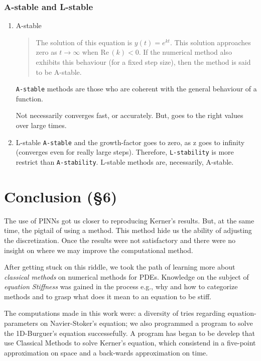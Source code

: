 \documentclass[11pt]{article}
\begin{document}
\subsubsection{A-stable and L-stable}
\label{sec:orgebec159}
\begin{enumerate}
\item A-stable
\label{sec:org2499429}

\begin{quote}
The solution of this equation is \(y(t) = e^{kt}\). This solution
approaches zero as \(t\to \infty\)  when  \(\mathrm {Re} \,(k)<0\). If the
numerical method also exhibits this behaviour (for a fixed step size),
then the method is said to be A-stable.
\end{quote}

\texttt{A-stable} methods are those who are coherent with the general
behaviour of a function.

Not necessarily converges fast, or accurately. But, goes to the right
values over large times.

\item L-stable
\label{sec:org46add7d}
\texttt{A-stable} and the growth-factor goes to zero, as z goes to infinity
(converges even for really large steps). Therefore, \texttt{L-stability} is more
restrict than \texttt{A-stability}. L-stable methods are, necessarily, A-stable.
\end{enumerate}

\section{Conclusion (§6)}
\label{sec:org36e2719}
The use of PINNs got us closer to reproducing Kerner's
results. But, at the same time, the pigtail of using a method. This method
hide us the ability of adjusting the discretization. Once the results were not
satisfactory and there were no insight on where we may improve the computational
method.

After getting stuck on this riddle, we took the path of learning more
about \emph{classical methods} on numerical methods for PDEs. Knowledge on
the subject of \emph{equation Stiffness} was gained in the process e.g., why
and how to categorize methods and to grasp what does it mean to an
equation to be stiff.

The computations made in this work were: a diversity of tries regarding equation-parameters on
Navier-Stoker's equation; we also programmed a program to solve the 1D-Burguer's
equation successefully. A program has began to be develep that use Classical
Methods to solve Kerner's equation, which consistend in a five-point
approximation on space and a back-wards approximation on time.


\end{document}
